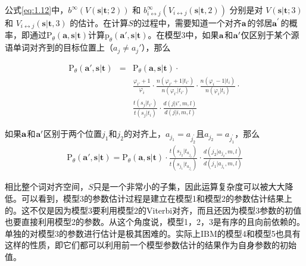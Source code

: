\begin{appendices}
\vspace{0.5em}
\parinterval 公式\ref{eq:1.12}中，$b^{\infty}(V(\mathbf{s}|\mathbf{t};2))$ 和 $b_{i \leftrightarrow j}^{\infty}(V_{i \leftrightarrow j}(\mathbf{s}|\mathbf{t},2))$ 分别是对 $V(\mathbf{s}|\mathbf{t};3)$ 和 $V_{i \leftrightarrow j}(\mathbf{s}|\mathbf{t},3)$ 的估计。在计算$S$的过程中，需要知道一个对齐$\bf{a}$的邻居$\bf{a}^{'}$的概率，即通过$\textrm{P}_{\theta}(\mathbf{a},\mathbf{s}|\mathbf{t})$计算$\textrm{p}_{\theta}(\mathbf{a}',\mathbf{s}|\mathbf{t})$。在模型3中，如果$\bf{a}$和$\bf{a}'$仅区别于某个源语单词对齐到的目标位置上（$a_j \neq a_{j}'$），那么

\begin{eqnarray}
\textrm{P}_{\theta}(\mathbf{a}',\mathbf{s}|\mathbf{t}) & = & \textrm{P}_{\theta}(\mathbf{a},\mathbf{s}|\mathbf{t}) \cdot  \nonumber \\
                                                                                   &     & \frac{\varphi_{i'}+1}{\varphi_i} \cdot \frac{n(\varphi_{i'}+1|t_{i'})}{n(\varphi_{i'}|t_{i'})} \cdot \frac{n(\varphi_{i}-1|t_{i})}{n(\varphi_{i}|t_{i})} \cdot \nonumber \\
                                                                                   &     & \frac{t(s_j|t_{i'})}{t(s_{j}|t_{i})} \cdot \frac{d(j|i',m,l)}{d(j|i,m,l)}
\label{eq:1.13}
\end{eqnarray}

\parinterval 如果$\bf{a}$和$\bf{a}'$区别于两个位置$j_1$和$j_2$的对齐上，$a_{j_{1}}=a_{j_{2}^{'}}$且$a_{j_{2}}=a_{j_{1}^{'}}$，那么
\begin{eqnarray}
\textrm{P}_{\theta}(\mathbf{a'},\mathbf{s}|\mathbf{t}) = \textrm{P}_{\theta}(\mathbf{a},\mathbf{s}|\mathbf{t}) \cdot \frac{t(s_{j_{2}}|t_{a_{j_{2}}})}{t(s_{j_{1}}|t_{a_{j_{1}}})} \cdot \frac{d(j_{2}|a_{j_{2}},m,l)}{d(j_{1}|a_{j_{1}},m,l)}
\label{eq:1.14}
\end{eqnarray}

\parinterval 相比整个词对齐空间，$S$只是一个非常小的子集，因此运算复杂度可以被大大降低。可以看到，模型3的参数估计过程是建立在模型1和模型2的参数估计结果上的。这不仅是因为模型3要利用模型2的Viterbi对齐，而且还因为模型3参数的初值也要直接利用模型2的参数。从这个角度说，模型1，2，3是有序的且向前依赖的。单独的对模型3的参数进行估计是极其困难的。实际上IBM的模型4和模型5也具有这样的性质，即它们都可以利用前一个模型参数估计的结果作为自身参数的初始值。



\end{appendices}
